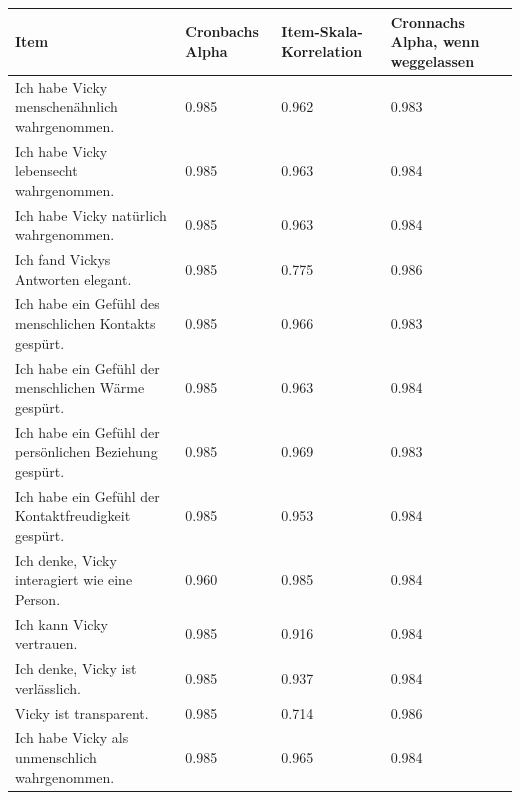 \begingroup
\footnotesize 
\begin{longtable}{|m{8cm}|m{2cm}|m{2cm}|m{2cm}|}
    \hline
    \rowcolor[HTML]{EFEFEF} 
    \centering \textbf{Item} &   \centering \textbf{Cronbachs Alpha}  &\centering \textbf{Item-Skala-Korrelation} &\centering \arraybackslash \textbf{Cronnachs Alpha, wenn weggelassen}\\    \hline \hline
     Ich habe Vicky menschenähnlich wahrgenommen.& 0.985 & 0.962 & 0.983                    \\ \hline 

    Ich habe Vicky lebensecht wahrgenommen. & 0.985 & 0.963 & 0.984                    \\ \hline

     Ich habe Vicky natürlich wahrgenommen.& 0.985 & 0.963 & 0.984                     \\ \hline

     Ich fand Vickys Antworten elegant. & 0.985& 0.775 & 0.986                    \\ \hline

     Ich habe ein Gefühl des menschlichen Kontakts gespürt.& 0.985 & 0.966 & 0.983                     \\ \hline

     Ich habe ein Gefühl der menschlichen Wärme gespürt.& 0.985& 0.963 & 0.984                    \\ \hline

     Ich habe ein Gefühl der persönlichen Beziehung gespürt.& 0.985& 0.969 & 0.983                   \\ \hline

      Ich habe ein Gefühl der Kontaktfreudigkeit gespürt. & 0.985& 0.953 & 0.984                  \\ \hline

     Ich denke, Vicky interagiert wie eine Person.& 0.960 & 0.985& 0.984                    \\ \hline

     Ich kann Vicky vertrauen.& 0.985 & 0.916 & 0.984                   \\ \hline

     Ich denke, Vicky ist verlässlich. & 0.985& 0.937 & 0.984                   \\ \hline

     Vicky ist transparent.& 0.985& 0.714 & 0.986                     \\ \hline

     Ich habe Vicky als unmenschlich wahrgenommen.& 0.985& 0.965 & 0.984                    \\ \hline


\end{longtable}
